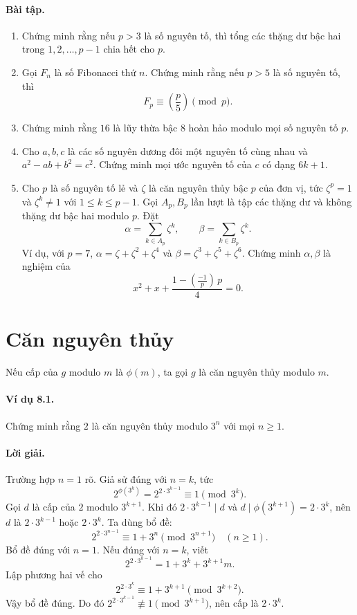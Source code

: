 \documentclass[11pt]{article}
\newcommand{\leg}[2]{\left(\frac{#1}{#2}\right)}
\begin{document}
\paragraph{Bài tập.}
\begin{enumerate}
\item Chứng minh rằng nếu \(p>3\) là số nguyên tố, thì tổng các thặng dư bậc
hai trong \(1,2,\ldots,p-1\) chia hết cho \(p\).
\item Gọi \(F_n\) là số Fibonacci thứ \(n\). Chứng minh rằng nếu \(p>5\) là số
nguyên tố, thì
\[
 F_p\equiv\leg p5\pmod p.
\]
\item Chứng minh rằng \(16\) là lũy thừa bậc \(8\) hoàn hảo modulo mọi số
nguyên tố \(p\).
\item Cho \(a,b,c\) là các số nguyên dương đôi một nguyên tố cùng nhau và
\(a^2-ab+b^2=c^2\). Chứng minh mọi ước nguyên tố của \(c\) có dạng \(6k+1\).
\item Cho \(p\) là số nguyên tố lẻ và \(\zeta\) là căn nguyên thủy bậc \(p\)
của đơn vị, tức \(\zeta^p=1\) và \(\zeta^k\ne1\) với \(1\le k\le p-1\). Gọi
\(A_p,B_p\) lần lượt là tập các thặng dư và không thặng dư bậc hai modulo \(p\).
Đặt
\[
 \alpha=\sum_{k\in A_p}\zeta^k,\qquad
 \beta=\sum_{k\in B_p}\zeta^k.
\]
Ví dụ, với \(p=7\), \(\alpha=\zeta+\zeta^2+\zeta^4\) và
\(\beta=\zeta^3+\zeta^5+\zeta^6\). Chứng minh \(\alpha,\beta\) là nghiệm của
\[
 x^2+x+\frac{1-\leg{-1}p\,p}{4}=0.
\]
\end{enumerate}

\section{Căn nguyên thủy}

Nếu cấp của \(g\) modulo \(m\) là \(\phi(m)\), ta gọi \(g\) là căn nguyên thủy
modulo \(m\).

\paragraph{Ví dụ 8.1.}
Chứng minh rằng \(2\) là căn nguyên thủy modulo \(3^n\) với mọi \(n\ge1\).

\paragraph{Lời giải.}
Trường hợp \(n=1\) rõ. Giả sử đúng với \(n=k\), tức
\[
 2^{\phi(3^k)}=2^{2\cdot3^{k-1}}\equiv1\pmod{3^k}.
\]
Gọi \(d\) là cấp của \(2\) modulo \(3^{k+1}\). Khi đó \(2\cdot3^{k-1}\mid d\)
và \(d\mid\phi(3^{k+1})=2\cdot3^k\), nên \(d\) là \(2\cdot3^{k-1}\) hoặc
\(2\cdot3^k\). Ta dùng bổ đề:
\[
 2^{2\cdot3^{n-1}}\equiv1+3^n\pmod{3^{n+1}}\quad(n\ge1).
\]
Bổ đề đúng với \(n=1\). Nếu đúng với \(n=k\), viết
\[
 2^{2\cdot3^{k-1}}=1+3^k+3^{k+1}m.
\]
Lập phương hai vế cho
\[
 2^{2\cdot3^k}\equiv1+3^{k+1}\pmod{3^{k+2}}.
\]
Vậy bổ đề đúng. Do đó \(2^{2\cdot3^{k-1}}\not\equiv1\pmod{3^{k+1}}\), nên cấp
là \(2\cdot3^k\).
\end{document}
